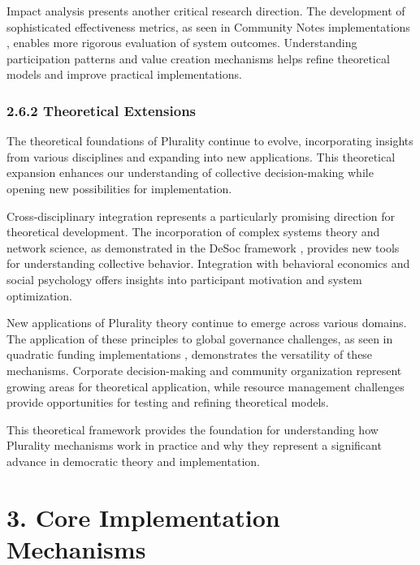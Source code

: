 Impact analysis presents another critical research direction. The development of sophisticated effectiveness metrics, as seen in Community Notes implementations \citep{communitynotes2024}, enables more rigorous evaluation of system outcomes. Understanding participation patterns and value creation mechanisms helps refine theoretical models and improve practical implementations.

\hypertarget{theoretical-extensions}{%
\subsubsection{2.6.2 Theoretical Extensions}\label{theoretical-extensions}}

The theoretical foundations of Plurality continue to evolve, incorporating insights from various disciplines and expanding into new applications. This theoretical expansion enhances our understanding of collective decision-making while opening new possibilities for implementation.

Cross-disciplinary integration represents a particularly promising direction for theoretical development. The incorporation of complex systems theory and network science, as demonstrated in the DeSoc framework \citep{weyl2022decentralized}, provides new tools for understanding collective behavior. Integration with behavioral economics and social psychology offers insights into participant motivation and system optimization.

New applications of Plurality theory continue to emerge across various domains. The application of these principles to global governance challenges, as seen in quadratic funding implementations \citep{buterin2019flexible}, demonstrates the versatility of these mechanisms. Corporate decision-making and community organization represent growing areas for theoretical application, while resource management challenges provide opportunities for testing and refining theoretical models.

This theoretical framework provides the foundation for understanding how Plurality mechanisms work in practice and why they represent a significant advance in democratic theory and implementation.

\hypertarget{core-implementation-mechanisms}{%
\section{3. Core Implementation Mechanisms}\label{core-implementation-mechanisms}}

